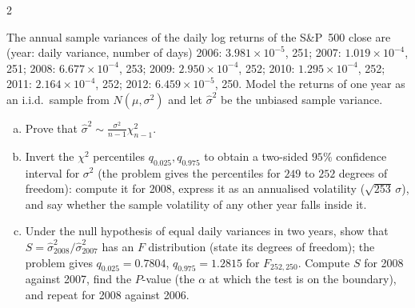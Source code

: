 \begin{paracol}{2}
\begin{exercise}\label{ch13:ex-ps5-4}
The annual sample variances of the daily log returns of the S\&P~500 close are (year: daily variance, number of days)
2006: $3.981\times10^{-5}$, 251; 2007: $1.019\times10^{-4}$, 251; 2008: $6.677\times10^{-4}$, 253; 2009: $2.950\times10^{-4}$, 252; 2010: $1.295\times10^{-4}$, 252; 2011: $2.164\times10^{-4}$, 252; 2012: $6.459\times10^{-5}$, 250.
Model the returns of one year as an i.i.d.\ sample from $N(\mu,\sigma^2)$ and let $\hat\sigma^2$ be the unbiased sample variance.
\begin{enumerate}[(a)]
  \item Prove that $\hat\sigma^2\sim\frac{\sigma^2}{n-1}\chi^2_{n-1}$.
  \item Invert the $\chi^2$ percentiles $q_{0.025},q_{0.975}$ to obtain a two-sided $95\%$ confidence interval for $\sigma^2$ (the problem gives the percentiles for $249$ to $252$ degrees of freedom): compute it for 2008, express it as an annualised volatility ($\sqrt{253}\,\sigma$),
      and say whether the sample volatility of any other year falls inside it.
  \item Under the null hypothesis of equal daily variances in two years, show that $S=\hat\sigma^2_{2008}/\hat\sigma^2_{2007}$ has an $F$ distribution (state its degrees of freedom); the problem gives $q_{0.025}=0.7804$, $q_{0.975}=1.2815$ for $F_{252,250}$. Compute $S$ for 2008 against 2007, find the
      $P$-value (the $\alpha$ at which the test is on the boundary), and repeat for 2008 against 2006.
\end{enumerate}
\end{exercise}


\end{paracol}
